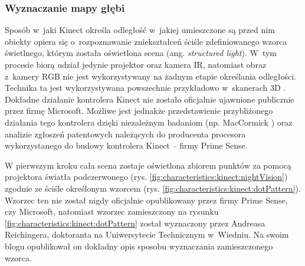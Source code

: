 \subsubsection*{Wyznaczanie mapy głębi}
Sposób w~jaki Kinect określa odległość w~jakiej umieszczone są przed nim obiekty opiera się o~rozpoznawanie zniekształceń ściśle zdefiniowanego wzorca świetlnego, którym została oświetlona scena (ang. \emph{structured light}). W~tym procesie biorą udział jedynie projektor oraz kamera IR, natomiast obraz z~kamery RGB nie jest wykorzystywany na żadnym etapie określania odległości. Technika ta jest wykorzystywana powszechnie przykładowo w~skanerach 3D \cite{david2016,lmi2016}. Dokładne działanie kontrolera Kinect nie zostało oficjalnie ujawnione publicznie przez firmę Microsoft. Możliwe jest jednakże przedstawienie przybliżonego działania tego kontrolera dzięki niezależnym badaniom (np. MacCormick \cite{MacCormick2011}) oraz analizie zgłoszeń patentowych \cite{patent:20080106746,patent:20100020078,patent:20100118123} należących do producenta procesora wykorzystanego do budowy kontrolera Kinect -- firmy Prime Sense.
		
W pierwszym kroku cała scena zostaje oświetlona zbiorem punktów za pomocą projektora światła podczerwonego (rys. \ref{fig:characteristics:kinect:nightVision}) zgodnie ze ściśle określonym wzorcem (rys. \ref{fig:characteristics:kinect:dotPattern}). Wzorzec ten nie został nigdy oficjalnie opublikowany przez firmy Prime Sense, czy Microsoft, natomiast wzorzec zamieszczony na rysunku \ref{fig:characteristics:kinect:dotPattern} został wyznaczony przez Andreasa Reichingera, doktoranta na Uniwersytecie Technicznym w~Wiedniu. Na swoim blogu opublikował on dokładny opis sposobu wyznaczania zamieszczonego wzorca\cite{reichinger2011}.
		
